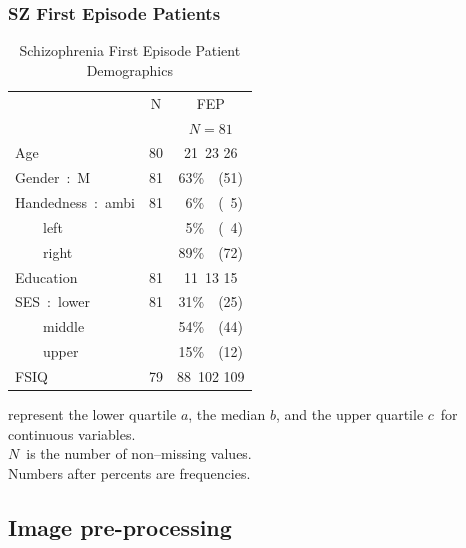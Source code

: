 \documentclass{article}\usepackage{graphicx, color}
\makeatletter
\newenvironment{kframe}{%
 \def\at@end@of@kframe{}%
 \ifinner\ifhmode%
  \def\at@end@of@kframe{\end{minipage}}%
  \begin{minipage}{\columnwidth}%
 \fi\fi%
 \def\FrameCommand##1{\hskip\@totalleftmargin \hskip-\fboxsep
 \colorbox{shadecolor}{##1}\hskip-\fboxsep
     \hskip-\linewidth \hskip-\@totalleftmargin \hskip\columnwidth}%
 \MakeFramed {\advance\hsize-\width
   \@totalleftmargin\z@ \linewidth\hsize
   \@setminipage}}%
 {\par\unskip\endMakeFramed%
 \at@end@of@kframe}
\newcommand{\todo}[1]{\begin{kframe}{\textcolor{red}{TODO #1}}\end{kframe}}
\makeatother
\begin{document}
\todo{Check table only includes 1.5T from the Screening}

\subsubsection{SZ First Episode Patients}
\todo{image characteristics, demographics}

%
\begin{table}[!tbp]
\scriptsize
\caption{Schizophrenia First Episode Patient Demographics\label{tab}} 
\begin{center}
\begin{tabular}{lrc}
\hline\hline
\multicolumn{1}{l}{}&\multicolumn{1}{c}{N}&\multicolumn{1}{c}{FEP}\tabularnewline
&&\multicolumn{1}{c}{{\scriptsize $N=81$}}\tabularnewline
\hline
Age&80&{\scriptsize 21~}{23 }{\scriptsize 26} \tabularnewline
Gender~:~M&81&63\%~{\scriptsize~(51)}\tabularnewline
Handedness~:~ambi&81&~6\%~{\scriptsize~(~5)}\tabularnewline
~~~~left&&~5\%~{\scriptsize~(~4)}\tabularnewline
~~~~right&&89\%~{\scriptsize~(72)}\tabularnewline
Education&81&{\scriptsize 11~}{13 }{\scriptsize 15} \tabularnewline
SES~:~lower&81&31\%~{\scriptsize~(25)}\tabularnewline
~~~~middle&&54\%~{\scriptsize~(44)}\tabularnewline
~~~~upper&&15\%~{\scriptsize~(12)}\tabularnewline
FSIQ&79&{\scriptsize  88~}{102 }{\scriptsize 109} \tabularnewline
\hline
\end{tabular}
\end{center}
 represent the lower quartile $a$, the median $b$, and the upper quartile $c$\ for continuous variables.\\$N$\ is the number of non--missing values.\\Numbers after percents are frequencies.\end{table}








\subsection{Image pre-processing}
\end{document}
